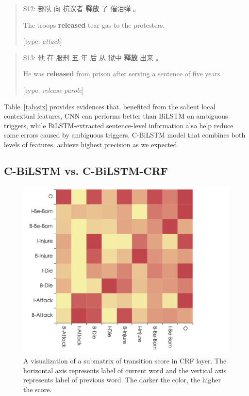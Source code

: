 \begin{quote}
	S12: 部队 向 抗议者 \textbf{释放} 了 催泪弹 。
	
	\hspace{0.75cm} The troops \textbf{released} tear gas to the protesters.
	
	\hspace{0.75cm} [type: \emph{attack}]
\end{quote}

\begin{quote}
	S13: 他 在 服刑 五 年 后 从 狱中 \textbf{释放} 出来 。
	
	\hspace{0.75cm} He was \textbf{released} from prison after serving a sentence of five years.
	
	\hspace{0.75cm} [type: \emph{release-parole}]
\end{quote}

\begin{table}
\end{table}

Table~\ref{tab:six} provides evidences that, benefited from the salient local contextual features, CNN can performs better than BiLSTM on ambiguous triggers, while BiLSTM-extracted sentence-level information also help reduce some errors caused by ambiguous triggers. C-BiLSTM model that combines both levels of features, achieve highest precision as we expected.

\subsection{C-BiLSTM vs. C-BiLSTM-CRF}

\begin{figure}
	\centering
	\includegraphics[width=.5\textwidth]{CRF.png}
	\caption{A visualization of a submatrix of transition score in CRF layer. The horizontal axis represents label of current word and the vertical axis represents label of previous word. The darker the color, the higher the score.}
	\label{figure3}
\end{figure}

